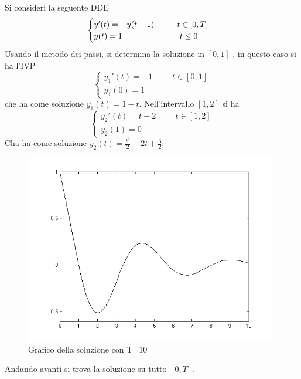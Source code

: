 \begin{exm}
Si consideri la seguente DDE
$$
\begin{cases}
 y'(t)=-y(t-1)		 	\hspace{1cm} 		t \in [0,T]	\\
 y(t)=1				\hspace{2.5cm}		t \le 0
\end{cases}
$$
Usando il metodo dei passi, si determina la soluzione in $[0,1]$ , 
in questo caso si ha l'IVP
$$
\begin{cases}
 y_1'(t)=-1		 	\hspace{1cm}		t \in [0,1]	\\
 y_1(0)=1 
\end{cases}
$$
che ha come soluzione $y_1(t)=1-t$. Nell'intervallo $[1,2]$ si ha
$$
\begin{cases}
 y_2'(t)=t-2		 	\hspace{1cm}		t \in [1,2]	\\
 y_2(1)=0 
\end{cases}
$$
Cha ha come soluzione $y_2(t)=\frac{t^2}{2}-2t  + \frac{3}{2}$.
\begin{figure}[h]
\centering
\caption{Grafico della soluzione con T=10}
\includegraphics[width=11cm]{immagini/immagine6.png}
\end{figure}
Andando avanti si trova la soluzione su tutto $[0,T]$.
\end{exm}
\vspace{1cm}
